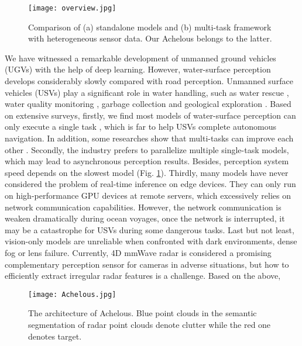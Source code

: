 \documentclass[letterpaper, 10 pt, conference]{ieeeconf}
\begin{document}
\begin{figure}
    \centering
    \texttt{[image: overview.jpg]}
    \caption{Comparison of (a) standalone models and (b) multi-task framework with heterogeneous sensor data. Our Achelous belongs to the latter.}
    \label{fig:overview}
\end{figure}

We have witnessed a remarkable development of unmanned ground vehicles (UGVs) with the help of deep learning. However, water-surface perception develops considerably slowly compared with road perception. Unmanned surface vehicles (USVs) play a significant role in water handling, such as water rescue \cite{yang2020maritime}, water quality monitoring \cite{zhu2019designing}, garbage collection \cite{madeo2020low} and geological exploration \cite{xue2019development}. Based on extensive surveys, firstly, we find most models of water-surface perception can only execute a single task \cite{haghbayan2018efficient}\cite{cheng2021robust}\cite{kim2021robust}, which is far to help USVs complete autonomous navigation. In addition, some researches show that multi-tasks can improve each other \cite{hybridnets}\cite{kendall2018multi}. Secondly, the industry prefers to parallelize multiple single-task models, which may lead to asynchronous perception results. Besides, perception system speed depends on the slowest model (Fig. \ref{fig:overview}). Thirdly, many models have never considered the problem of real-time inference on edge devices. They can only run on high-performance GPU devices \cite{hybridnets}\cite{yolop} at remote servers, which excessively relies on network communication capabilities. However, the network communication is weaken dramatically during ocean voyages, once the network is interrupted, it may be a catastrophe for USVs during some dangerous tasks. Last but not least, vision-only models \cite{zhang2019real}\cite{liu2021sea} are unreliable when confronted with dark environments, dense fog or lens failure. Currently, 4D mmWave radar is considered a promising complementary perception sensor for cameras in adverse situations, but how to efficiently extract irregular radar features is a challenge. Based on the above,  

\begin{figure*}
    \centering
    \texttt{[image: Achelous.jpg]}
    \caption{The architecture of Achelous. Blue point clouds in the semantic segmentation of radar point clouds denote clutter while the red one denotes target.}
    \label{fig:Achelous}
\end{figure*}
\end{document}
